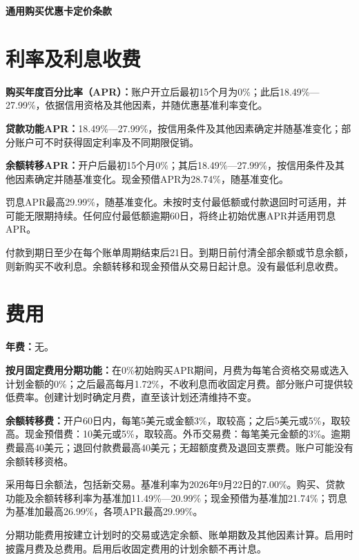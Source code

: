 \documentclass[UTF8,fontset=none,11pt,a4paper]{ctexart}
\begin{document}
{\noindent\fontsize{20}{25}\selectfont\bfseries 通用购买优惠卡定价条款\par}
\vspace{10pt}
\section*{利率及利息收费}
\textbf{购买年度百分比率（APR）：}账户开立后最初15个月为0\%；此后18.49\%—27.99\%，依据信用资格及其他因素，并随优惠基准利\allowbreak\mbox{率变化。}


\textbf{贷款功能APR：}18.49\%—27.99\%，按信用条件及其他因素确定并随基准变化；部分账户可不时获得固定利率及不同\allowbreak\mbox{期限促销。}


\textbf{余额转移APR：}开户后最初15个月0\%；其后18.49\%—27.99\%，按信用条件及其他因素确定并随基准变化。现金预借APR为28.74\%，随\allowbreak\mbox{基准变化。}


罚息APR最高29.99\%，随基准变化。未按时支付最低额或付款退回时可适用，并可能无限期持续。任何应付最低额逾期60日，将终止初始优惠APR并适用罚息APR。


付款到期日至少在每个账单周期结束后21日。到期日前付清全部余额或节息余额，则新购买不收利息。余额转移和现金预借从交易日起计息。没有最低\allowbreak\mbox{利息收费。}


\section*{费用}
\textbf{年费：}无。


\textbf{按月固定费用分期功能：}在0\%初始购买APR期间，月费为每笔合资格交易或选入计划金额的0\%；之后最高每月1.72\%，不收利息而收固定月费。部分账户可提供较低费率。创建计划时确定月费，直至该计划还清\allowbreak\mbox{维持不变。}


\textbf{余额转移费：}开户60日内，每笔5美元或金额3\%，取较高；之后5美元或5\%，取较高。现金预借费：10美元或5\%，取较高。外币交易费：每笔美元金额的3\%。逾期费最高40美元；退回付款费最高40美元；无超额度费及退回支票费。账户可能没有余额\allowbreak\mbox{转移资格。}


采用每日余额法，包括新交易。基准利率为2026年9月22日的7.00\%。购买、贷款功能及余额转移利率为基准加11.49\%—20.99\%；现金预借为基准加21.74\%；罚息为基准加最高26.99\%，各项APR最高29.99\%。


分期功能费用按建立计划时的交易或选定余额、账单期数及其他因素计算。启用时披露月费及总费用。启用后收固定费用的计划余额\allowbreak\mbox{不再计息。}
\end{document}
